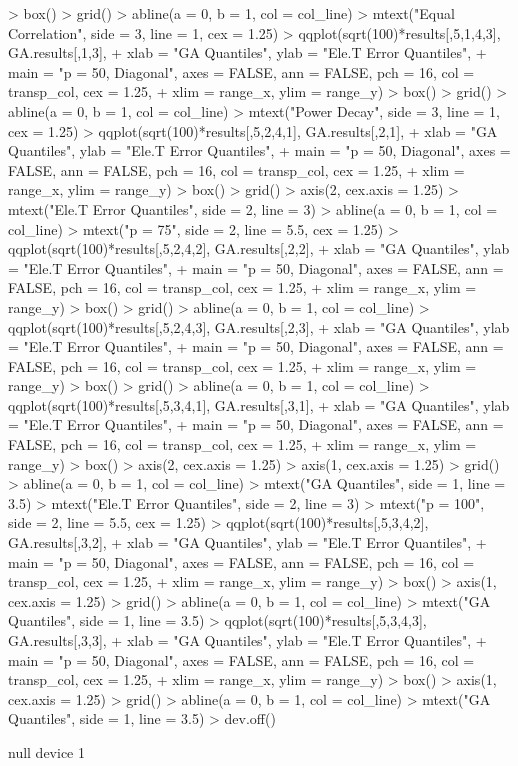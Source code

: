 \documentclass{article}
\begin{document}
\begin{Schunk}
\begin{Sinput}
> box()
> grid()
> abline(a = 0, b = 1, col = col_line)
> mtext("Equal Correlation", side = 3, line = 1, cex = 1.25)
> qqplot(sqrt(100)*results[,5,1,4,3], GA.results[,1,3],
+        xlab = "GA Quantiles", ylab = "Ele.T Error Quantiles",
+        main = "p = 50, Diagonal", axes = FALSE, ann = FALSE, pch = 16, col = transp_col, cex = 1.25,
+        xlim = range_x, ylim = range_y)
> box()
> grid()
> abline(a = 0, b = 1, col = col_line)
> mtext("Power Decay", side = 3, line = 1, cex = 1.25)
> qqplot(sqrt(100)*results[,5,2,4,1], GA.results[,2,1],
+        xlab = "GA Quantiles", ylab = "Ele.T Error Quantiles",
+        main = "p = 50, Diagonal", axes = FALSE, ann = FALSE, pch = 16, col = transp_col, cex = 1.25,
+        xlim = range_x, ylim = range_y)
> box()
> grid()
> axis(2, cex.axis = 1.25)
> mtext("Ele.T Error Quantiles", side = 2, line = 3)
> abline(a = 0, b = 1, col = col_line)
> mtext("p = 75", side = 2, line = 5.5, cex = 1.25)
> qqplot(sqrt(100)*results[,5,2,4,2], GA.results[,2,2],
+        xlab = "GA Quantiles", ylab = "Ele.T Error Quantiles",
+        main = "p = 50, Diagonal", axes = FALSE, ann = FALSE, pch = 16, col = transp_col, cex = 1.25,
+        xlim = range_x, ylim = range_y)
> box()
> grid()
> abline(a = 0, b = 1, col = col_line)
> qqplot(sqrt(100)*results[,5,2,4,3], GA.results[,2,3],
+        xlab = "GA Quantiles", ylab = "Ele.T Error Quantiles",
+        main = "p = 50, Diagonal", axes = FALSE, ann = FALSE, pch = 16, col = transp_col, cex = 1.25,
+        xlim = range_x, ylim = range_y)
> box()
> grid()
> abline(a = 0, b = 1, col = col_line)
> qqplot(sqrt(100)*results[,5,3,4,1], GA.results[,3,1],
+        xlab = "GA Quantiles", ylab = "Ele.T Error Quantiles",
+        main = "p = 50, Diagonal", axes = FALSE, ann = FALSE, pch = 16, col = transp_col, cex = 1.25,
+        xlim = range_x, ylim = range_y)
> box()
> axis(2, cex.axis = 1.25)
> axis(1, cex.axis = 1.25)
> grid()
> abline(a = 0, b = 1, col = col_line)
> mtext("GA Quantiles", side = 1, line = 3.5)
> mtext("Ele.T Error Quantiles", side = 2, line = 3)
> mtext("p = 100", side = 2, line = 5.5, cex = 1.25)
> qqplot(sqrt(100)*results[,5,3,4,2], GA.results[,3,2],
+        xlab = "GA Quantiles", ylab = "Ele.T Error Quantiles",
+        main = "p = 50, Diagonal", axes = FALSE, ann = FALSE, pch = 16, col = transp_col, cex = 1.25,
+        xlim = range_x, ylim = range_y)
> box()
> axis(1, cex.axis = 1.25)
> grid()
> abline(a = 0, b = 1, col = col_line)
> mtext("GA Quantiles", side = 1, line = 3.5)
> qqplot(sqrt(100)*results[,5,3,4,3], GA.results[,3,3],
+        xlab = "GA Quantiles", ylab = "Ele.T Error Quantiles",
+        main = "p = 50, Diagonal", axes = FALSE, ann = FALSE, pch = 16, col = transp_col, cex = 1.25,
+        xlim = range_x, ylim = range_y)
> box()
> axis(1, cex.axis = 1.25)
> grid()
> abline(a = 0, b = 1, col = col_line)
> mtext("GA Quantiles", side = 1, line = 3.5)
> dev.off()
\end{Sinput}
\begin{Soutput}
null device 
          1 
\end{Soutput}
\end{Schunk}

\begin{figure}

\end{figure}
\end{document}
